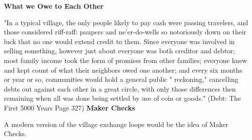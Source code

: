 \documentclass{article}
\begin{document}
\pagebreak
{\huge \textbf{What we Owe to Each Other}}

\begin{minipage}[t]{0.66\textwidth}
	\vspace{0pt}
	"In a typical village, the only people likely to pay cash were passing
	travelers, and those considered riff-raff: paupers and ne'er-do-wells so
	notoriously down on their luck that no one would extend credit to
	them. Since everyone was involved in selling something, however just
	about everyone was both creditor and debtor; most family income took
	the form of promises from other families; everyone knew and kept
	count of what their neighbors owed one another; and every six months
	or year or so, communities would hold a general public " reckoning,"
	cancelling debts out against each other in a great circle, with only those
	differences then remaining when all was done being settled by use of
	coin or goods." (Debt: The First 5000 Years Page 327)
	\large \textbf{Maker Checks}
	
	A modern version of the village exchange loops would be the idea of Maker Checks. 

\end{minipage}%
\begin{minipage}[t]{0.33\textwidth}
	\vspace{0pt}
	\centering
	\begin{turn}{90}

	\end{turn}
\end{minipage}
\end{document}
